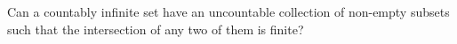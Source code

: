 Can a countably infinite set have an uncountable collection of
non-empty subsets such that the intersection of any two of them is
finite?
